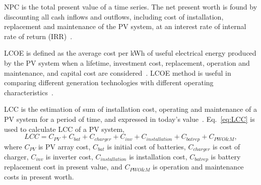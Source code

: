 \documentclass[review]{elsarticle}
\begin{document}
NPC is the total present value of a time series. The net present worth is found by discounting all cash inflows and outflows, including cost of installation, replacement and maintenance of the PV system, at an interest rate of internal rate of return (IRR)~\cite{Park2004}.

LCOE is defined as the average cost per kWh of useful electrical energy produced by the PV system when a lifetime, investment cost, replacement, operation and maintenance, and capital cost are considered~\cite{Kamel2005}. LCOE method is useful in comparing different generation technologies with different operating characteristics~\cite{Zhou2010}.

LCC is the estimation of sum of installation cost, operating and maintenance of a PV system for a period of time, and expressed in today's value~\cite{Applasamy2011}. Eq.~\ref{eq:LCC} is used to calculate LCC of a PV system,
%
\begin{equation}
\label{eq:LCC}
LCC = C_{PV} + C_{bat} + C_{charger} + C_{inv} + C_{installation} + C_{batrep} + C_{PWO\&M},
\end{equation}
\noindent where $C_{PV}$ is PV array cost, $C_{bat}$ is initial cost of batteries, $C_{charger}$ is cost of charger, $C_{inv}$ is inverter cost, $C_{installation}$ is installation cost, $C_{batrep}$ is battery replacement cost in present value, and $C_{PWO\&M}$ is operation and maintenance costs in present worth.

%
\end{document}

